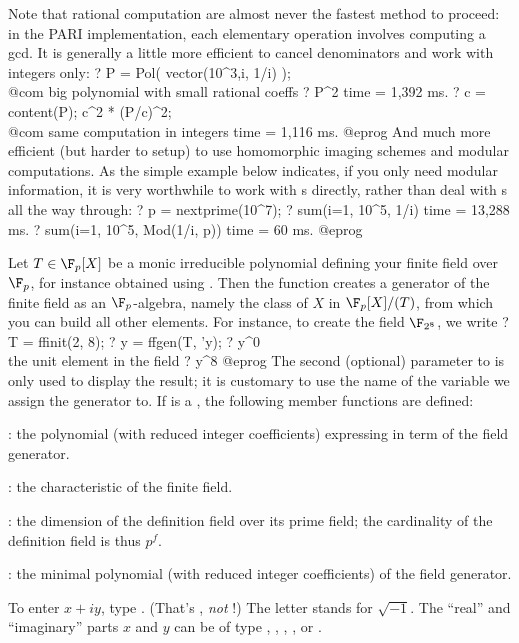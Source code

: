 Note that rational computation are almost never the fastest method to proceed:
in the PARI implementation, each elementary operation involves computing a gcd.
It is generally a little more efficient to cancel denominators and work with
integers only:
\bprog
? P = Pol( vector(10^3,i, 1/i) ); \\@com big polynomial with small rational coeffs
? P^2
time = 1,392 ms.
? c = content(P); c^2 * (P/c)^2;  \\@com same computation in integers
time = 1,116 ms.
@eprog\noindent
And much more efficient (but harder to setup) to use homomorphic imaging
schemes and modular computations. As the simple example below indicates, if you
only need modular information, it is very worthwhile to work with
s directly, rather than deal with s all the way through:
\bprog
? p = nextprime(10^7);
? sum(i=1, 10^5, 1/i) %
time = 13,288 ms.
? sum(i=1, 10^5, Mod(1/i, p))
time = 60 ms.
@eprog\noindent

%
Let $T\in\F_p[X]$ be a monic irreducible polynomial defining your
finite field over $\F_p$, for instance obtained using . Then the
 function creates a generator of the finite field as an
$\F_p$-algebra, namely the class of $X$ in $\F_p[X]/(T)$, from which you can
build all other elements. For instance, to create the field $\F_{2^8}$, we
write
\bprog
? T = ffinit(2, 8);
? y = ffgen(T, 'y);
? y^0    \\ the unit element in the field
? y^8
@eprog\noindent
The second (optional) parameter to  is only used to display
the result; it is customary to use the name of the variable we assign the
generator to. If  is a , the following member functions are
defined:

: the polynomial (with reduced integer coefficients)
expressing  in term of the field generator.

: the characteristic of the finite field.

: the dimension of the definition field over its prime field; the
cardinality of the definition field is thus $p^f$.

: the minimal polynomial (with reduced integer
coefficients) of the field generator.

%
To enter $x+iy$, type . (That's , \emph{not} !)
The letter  stands for $\sqrt{-1}$. The ``real'' and ``imaginary''
parts $x$ and $y$ can be of type , , ,
, or .

